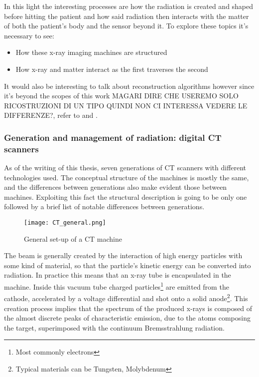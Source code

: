In this light the interesting processes are how the radiation is created and shaped before hitting the patient and how said radiation then interacts with the matter of both the patient's body and the sensor beyond it. To explore these topics it's necessary to see:
\begin{itemize}
\item How these x-ray imaging machines are structured 
\item How x-ray and matter interact as the first traverses the second
\end{itemize}

It would also be interesting to talk about reconstruction algorithms however since it's beyond the scopes of this work {\Large MAGARI DIRE CHE USEREMO SOLO RICOSTRUZIONI DI UN TIPO QUINDI NON CI INTERESSA VEDERE LE DIFFERENZE?}, refer to \cite{xray_reconstruction} and \cite{PhysicsMedicalImaging}.

\subsubsection{Generation and management of radiation: digital CT scanners}

As of the writing of this thesis, seven generations of CT scanners with different technologies used. The conceptual structure of the machines is mostly the same, and the differences between generations also make evident those between machines. Exploiting this fact the structural description is going to be only one followed by a brief list of notable differences between generations.

\begin{figure}[H]
\centering
  		\texttt{[image: CT\_general.png]}
        \caption{General set-up of a CT machine\label{fig:CT-machine}}
\end{figure}

The beam is generally created by the interaction of high energy particles with some kind of material, so that the particle's kinetic energy can be converted into radiation. In practice this means that an x-ray tube is encapsulated in the machine. Inside this vacuum tube charged particles\footnote{Most commonly electrons} are emitted from the cathode, accelerated by a voltage differential and shot onto a solid anode\footnote{Typical materials can be Tungsten, Molybdenum}. This creation process implies that the spectrum of the produced x-rays is composed of the almost discrete peaks of characteristic emission, due to the atoms composing the target, superimposed with the continuum Bremsstrahlung radiation.

